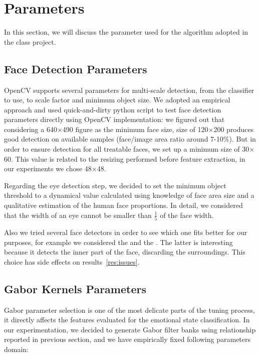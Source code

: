 \section{Parameters}

In this section, we will discuss the parameter used for the algorithm adopted in the class project.

\subsection{Face Detection Parameters}

OpenCV supports several parameters for multi-scale detection, from the classifier to use, to scale factor and minimum object size. We adopted an empirical approach and used quick-and-dirty python script to test face detection parameters directly using OpenCV implementation: we figured out that considering a 640$\times$490 figure as the minimum face size, size of 120$\times$200 produces good detection on available samples (face/image area ratio around 7-10\%).
But in order to ensure detection for all treatable faces, we set up a minimum size of 30$\times$60. This value is related to the resizing performed before feature extraction, in our experiments we chose 48$\times$48.

Regarding the eye detection step, we decided to set the minimum object threshold to a dynamical value calculated using knowledge of face area size and a qualitative estimation of the human face proportions. In detail, we considered that the width of an eye cannot be smaller than $\frac{1}{5}$ of the face width.

Also we tried several face detectors in order to see which one fits better for our purposes, for example we considered the  and the . The latter is interesting because it detects the inner part of the face, discarding the surroundings. This choice has side effects on results~\ref{res:issues}.

\subsection{Gabor Kernels Parameters}

Gabor parameter selection is one of the most delicate parts of the tuning process, it directly affects the features evaluated for the emotional state classification.
In our experimentation, we decided to generate Gabor filter banks using relationship reported in previous section, and we have empirically fixed following parameters domain:

